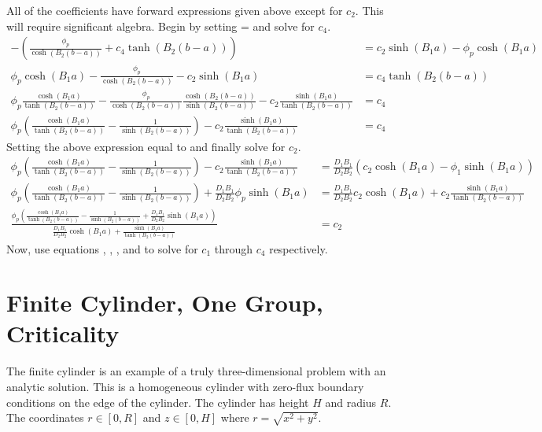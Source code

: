   All of the coefficients have forward expressions given above except for 
  $c_2$. This will require significant algebra. Begin by setting 
   =  and solve for $c_4$.
  \begin{align}
    - \left( \frac{\phi_p}{\cosh(B_2(b-a))} + c_4 \tanh(B_2 (b-a))\right)&=
      c_2 \sinh(B_1 a) - \phi_p \cosh(B_1 a) \\
    \phi_p \cosh(B_1 a) - \frac{\phi_p}{\cosh(B_2(b-a))} - 
      c_2 \sinh(B_1 a) &= c_4 \tanh(B_2 (b-a)) \\
    \phi_p \frac{\cosh(B_1 a)}{\tanh(B_2(b-a))} - 
      \frac{\phi_p}{\cosh(B_2(b-a))} 
      \frac{\cosh(B_2(b-a))}{\sinh(B_2(b-a))} - 
      c_2 \frac{\sinh(B_1 a)}{\tanh(B_2(b-a))} &= c_4\\
    \phi_p \left(\frac{\cosh(B_1 a)}{\tanh(B_2(b-a))} - \frac{1}
      {\sinh(B_2(b-a))} \right) - c_2 \frac{\sinh(B_1a)}{\tanh(B_2(b-a))} 
      &= c_4
  \end{align}
  Setting the above expression equal to  and finally 
  solve for $c_2$.
  \begin{align}
    \phi_p \left(\frac{\cosh(B_1 a)}{\tanh(B_2(b-a))} - 
      \frac{1}{\sinh(B_2(b-a))}\right) -
      c_2 \frac{\sinh(B_1 a)}{\tanh(B_2(b-a))} &=
      \frac{D_1 B_1}{D_2 B_2} \left( c_2 \cosh(B_1 a) - 
      \phi_1 \sinh(B_1 a)\right) \\
    \phi_p \left(\frac{\cosh(B_1 a)}{\tanh(B_2(b-a))} - 
      \frac{1}{\sinh(B_2(b-a))} \right) + 
      \frac{D_1 B_1}{D_2 B_2} \phi_p \sinh(B_1 a) &= 
      \frac{D_1 B_1}{D_2 B_2} c_2 \cosh(B_1a) + 
      c_2 \frac{\sinh(B_1a)}{\tanh(B_2(b-a))} \\
    \frac{\phi_p \left( \frac{\cosh(B_1a)}{\tanh(B_2(b-a))} - 
      \frac{1}{\sinh(B_2(b-a))} + 
      \frac{D_1 B_1}{D_2B_2} \sinh(B_1a) \right)}
      {\frac{D_1B_1}{D_2B_2} \cosh(B_1a) + 
      \frac{\sinh(B_1a)}{\tanh(B_2(b-a))}} &= c_2 \label{eq:c2}
  \end{align}
  Now, use equations , , , and 
   to solve for $c_1$ through $c_4$ respectively.
  
\section{Finite Cylinder, One Group, Criticality}
  The finite cylinder is an example of a truly three-dimensional problem with
  an analytic solution. This is a homogeneous cylinder with zero-flux boundary
  conditions on the edge of the cylinder. The cylinder has height $H$ and 
  radius $R$. The coordinates $r\in[0,R]$ and $z\in[0,H]$ where 
  $r=\sqrt{x^2+y^2}$.
  
